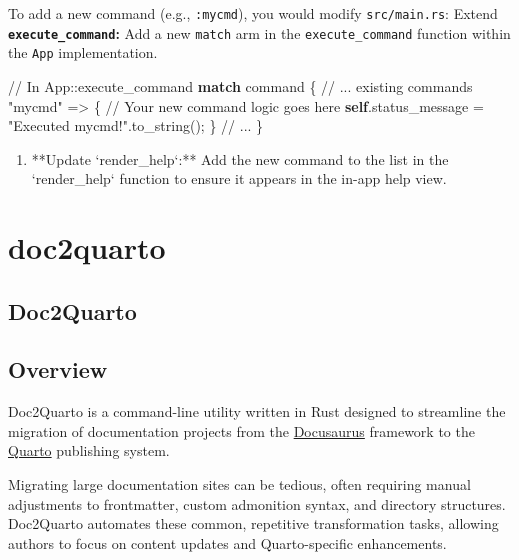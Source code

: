 \documentclass[
  letterpaper,
  DIV=11,
  numbers=noendperiod]{scrreprt}
\newenvironment{Shaded}{\begin{snugshade}}{\end{snugshade}}
\newcommand{\CommentTok}[1]{\textcolor[rgb]{0.37,0.37,0.37}{#1}}
\newcommand{\ControlFlowTok}[1]{\textcolor[rgb]{0.00,0.23,0.31}{\textbf{#1}}}
\newcommand{\KeywordTok}[1]{\textcolor[rgb]{0.00,0.23,0.31}{\textbf{#1}}}
\newcommand{\NormalTok}[1]{\textcolor[rgb]{0.00,0.23,0.31}{#1}}
\newcommand{\OperatorTok}[1]{\textcolor[rgb]{0.37,0.37,0.37}{#1}}
\newcommand{\StringTok}[1]{\textcolor[rgb]{0.13,0.47,0.30}{#1}}
\providecommand{\tightlist}{%
  \setlength{\itemsep}{0pt}\setlength{\parskip}{0pt}}
\begin{document}
To add a new command (e.g., \texttt{:mycmd}), you would modify
\texttt{src/main.rs}: Extend \textbf{\texttt{execute\_command}:} Add a
new \texttt{match} arm in the \texttt{execute\_command} function within
the \texttt{App} implementation.

\begin{Shaded}
\begin{Highlighting}[]
    \CommentTok{// In App::execute\_command}
    \ControlFlowTok{match}\NormalTok{ command }\OperatorTok{\{}
        \CommentTok{// ... existing commands}
        \StringTok{"mycmd"} \OperatorTok{=\textgreater{}} \OperatorTok{\{}
            \CommentTok{// Your new command logic goes here}
            \KeywordTok{self}\OperatorTok{.}\NormalTok{status\_message }\OperatorTok{=} \StringTok{"Executed mycmd!"}\OperatorTok{.}\NormalTok{to\_string()}\OperatorTok{;}
        \OperatorTok{\}}
        \CommentTok{// ...}
    \OperatorTok{\}}
\end{Highlighting}
\end{Shaded}

\begin{enumerate}
\def\labelenumi{\arabic{enumi}.}
\setcounter{enumi}{1}
\tightlist
\item
  **Update `render\_help`:** Add the new command to the list in the
  `render\_help` function to ensure it appears in the in-app help view.
\end{enumerate}

\part{doc2quarto}

\chapter{Doc2Quarto}\label{doc2quarto-2}

\chapter{Overview}\label{overview-2}

Doc2Quarto is a command-line utility written in Rust designed to
streamline the migration of documentation projects from the
\href{https://docusaurus.io/}{Docusaurus} framework to the
\href{https://quarto.org/}{Quarto} publishing system.

Migrating large documentation sites can be tedious, often requiring
manual adjustments to frontmatter, custom admonition syntax, and
directory structures. Doc2Quarto automates these common, repetitive
transformation tasks, allowing authors to focus on content updates and
Quarto-specific enhancements.
\end{document}
